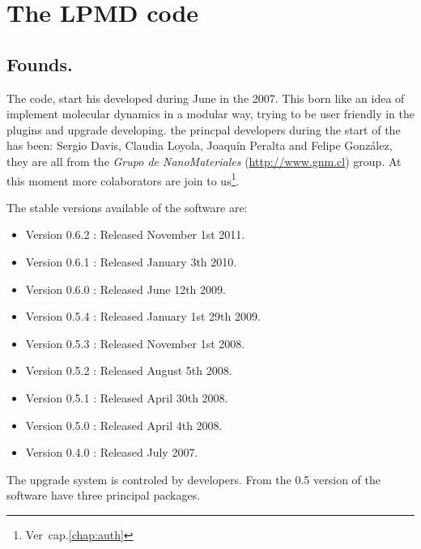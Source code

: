 \chapter{The LPMD code}
\label{chap:lpmd}

\section{Founds.}

The {\lpmd} code, start his developed during June in the 2007. This born like
an idea of implement molecular dynamics in a modular way, trying to be
user friendly  in the plugins and upgrade developing. the princpal developers
during the start of the has been: Sergio Davis, Claudia Loyola, Joaqu\'in
Peralta and Felipe Gonz\'alez, they are all from the \textit{Grupo de
NanoMateriales} (\url{http://www.gnm.cl}) group. At this moment more
colaborators are join to us\footnote{Ver~cap.\ref{chap:auth}}.

The stable versions available of the software are:

\begin{itemize}
 \item Version 0.6.2 : Released November 1st 2011.
 \item Version 0.6.1 : Released January 3th 2010.
 \item Version 0.6.0 : Released June 12th 2009.
 \item Version 0.5.4 : Released January 1st 29th 2009.
 \item Version 0.5.3 : Released November 1st 2008.
 \item Version 0.5.2 : Released August 5th 2008.
 \item Version 0.5.1 : Released April 30th 2008.
 \item Version 0.5.0 : Released April 4th 2008.
 \item Version 0.4.0 : Released July 2007.
\end{itemize}

The upgrade system is controled by developers. From the 0.5 version of {\lpmd}
the software have three principal packages.

